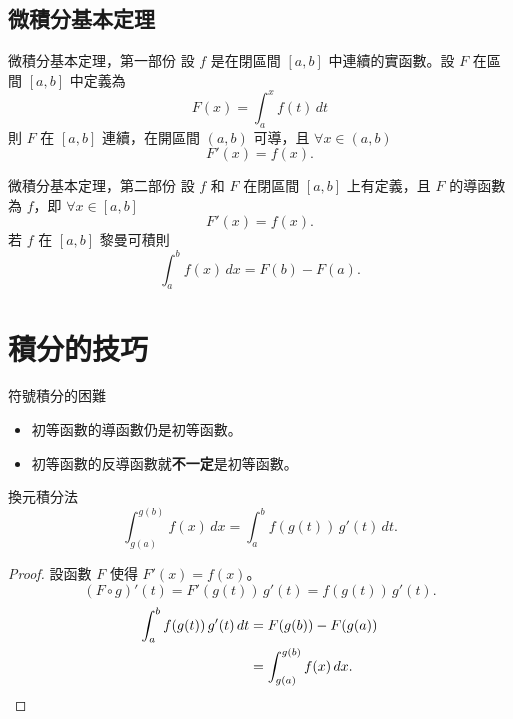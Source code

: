 \documentclass{beamer}
\newcommand{\negskip}{\vskip -2em plus 3pt minus 3pt}
\theoremstyle{remark}
\begin{document}
\begin{CJK}{UTF8}{bsmi}
\subsection{微積分基本定理}
\begin{frame}{微積分基本定理，第一部份}
  設 $f$ 是在閉區間 $[a,b]$ 中連續的實函數。設 $F$ 在區間 $[a,b]$ 中定義為
  \[F(x) = \int_a^x f(t)\,dt\]
  則 $F$ 在 $[a,b]$ 連續，在開區間 $(a,b)$ 可導，且 $\forall x \in (a,b)$
  \[F'(x) = f(x).\]
\end{frame}

\begin{frame}{微積分基本定理，第二部份}
  設 $f$ 和 $F$ 在閉區間 $[a,b]$ 上有定義，且 $F$ 的導函數為 $f$，即 $\forall x \in [a,b]$
  \[F'(x) = f(x).\]
  若 $f$ 在 $[a,b]$ 黎曼可積則
  \[\int_a^b f(x)\,dx = F(b) - F(a).\]
\end{frame}

\section{積分的技巧}
\begin{frame}{符號積分的困難}
  \begin{itemize}
    \item 初等函數的導函數仍是初等函數。
    \item 初等函數的反導函數就\textbf{不一定}是初等函數。
  \end{itemize}
\end{frame}

\begin{frame}{換元積分法}
  \[\int_{g(a)}^{g(b)} f(x)\,dx = \int_a^b f(g(t))\,g'(t)\,dt.\]
  \begin{proof}
    設函數 $F$ 使得 $F'(x) = f(x)$。
    \[(F \circ g)'(t) = F'(g(t))\,g'(t) = f(g(t))\,g'(t).\]
    \begin{align*}
      \int_a^b f(g(t))\,g'(t)\,dt &= F(g(b)) - F(g(a))\\
	&= \int_{g(a)}^{g(b)} f(x)\,dx. \qedhere
    \end{align*}
  \end{proof}
\end{frame}



\end{CJK}
\end{document}
